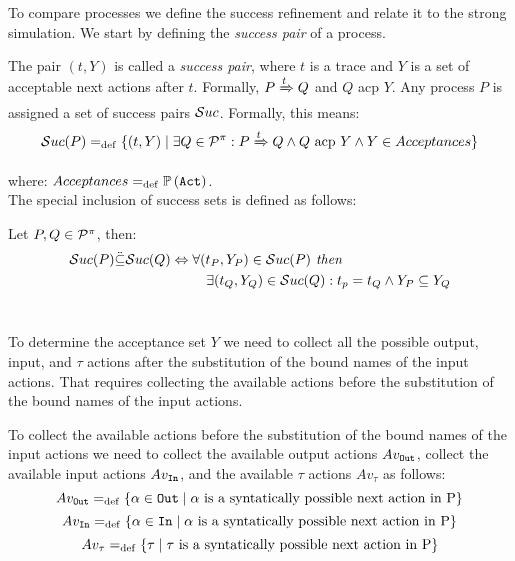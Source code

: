 To compare \picalc{} processes we define the success refinement and relate it to the strong simulation. We start by defining the \textit{success pair} of a process.

The pair $(t, Y)$ is called a \textit{success pair}, where $t$ is a trace and $Y$ is a set of acceptable next actions after $t$. Formally, $P \xRightarrow{t} Q$ and $Q$ acp $Y$. Any process
$P$ is assigned a set of success pairs $\Successes[]$. Formally, this means:
\begin{align}
    \Successes[P] \define \{(t,Y) \mid \exists Q\in\procs: P \bigstep{t} Q \wedge Q \text{ acp } Y \wedge Y\in Acceptances\}
\end{align}

where: $Acceptances =_{\mathrm{def}} \mathbb P\left(\mathtt{Act}\right)$.
\\The special inclusion of success sets is defined as follows:
\begin{definition}
\label{def_success_inclutuion_ref}
Let $P,Q\in\mathcal P^{\pi}$, then:
\begin{equation*}
\begin{aligned}
\Successes[P] \ddot{\subseteq} \Successes[Q] \Leftrightarrow {} & \forall (t_P, Y_P) \in \Successes[P] \textit{ then }\\
      & \ \ \ \exists (t_Q, Y_Q) \in \Successes[Q]: t_p = t_Q \wedge Y_P \subseteq Y_Q
\end{aligned}
\end{equation*}
\ 
\end{definition}
To determine the acceptance set $Y$ we need to collect all the possible output, input, and $\tau$ actions after the substitution of the bound names of the input actions. That requires collecting the available actions before the substitution of the bound names of the input actions.

To collect the available actions before the substitution of the bound names of the input actions we need to collect the available output actions $Av_{\mathtt{Out}}$, collect the available input actions $Av_{\mathtt{In}}$, and the available $\tau$ actions $Av_\tau$ as follows:
\[Av_{\mathtt{Out}}=_{\mathrm{def}}\{ \alpha \in \mathtt{Out} \mid \alpha\text{ is a syntatically possible next action in P}\}\]
\[Av_{\mathtt{In}}=_{\mathrm{def}}\{ \alpha \in \mathtt{In} \mid \alpha\text{ is a syntatically possible next action in P}\}\]
\[Av_\tau=_{\mathrm{def}}\{ \tau \mid \tau\text{ is a syntatically possible next action in P}\}\]

